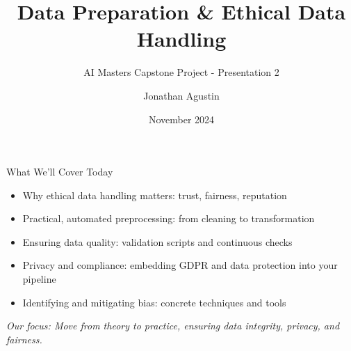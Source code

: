 \documentclass[aspectratio=169]{beamer}
\title{Data Preparation \& Ethical Data Handling}
\subtitle{AI Masters Capstone Project - Presentation 2}
\author{Jonathan Agustin}
\date{November 2024}
\begin{document}
%
%
%
\maketitle

%
\begin{frame}{What We’ll Cover Today}
\begin{itemize}
\item Why ethical data handling matters: trust, fairness, reputation
\item Practical, automated preprocessing: from cleaning to transformation
\item Ensuring data quality: validation scripts and continuous checks
\item Privacy and compliance: embedding GDPR and data protection into your pipeline
\item Identifying and mitigating bias: concrete techniques and tools
\end{itemize}

\vspace{0.8em}
\emph{Our focus: Move from theory to practice, ensuring data integrity, privacy, and fairness.}
\end{frame}
\end{document}

